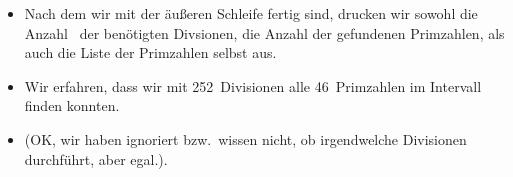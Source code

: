 \documentclass[aspectratio=169,mathserif,notheorems]{beamer}%
\begin{document}
\begin{frame}
{{{\begin{itemize}
{}%
%
%
%
\item<45-> Nach dem wir mit der äußeren Schleife fertig sind, drucken wir sowohl die Anzahl~ der benötigten Divsionen, die Anzahl  der gefundenen Primzahlen, als auch die Liste  der Primzahlen selbst aus.%
%
\item<46-> Wir erfahren, dass wir mit 252~Divisionen alle 46~Primzahlen im Intervall~ finden konnten.%
%
\item<47-> (OK, wir haben ignoriert bzw.\ wissen nicht, ob  irgendwelche Divisionen durchführt, aber egal.).%
%
\end{itemize}%
}}}%
%
%
%
%
\end{frame}%
%
\end{document}
